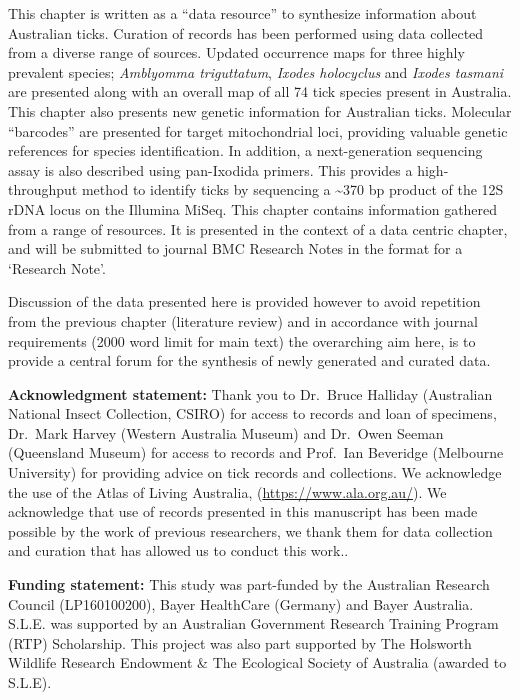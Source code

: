 \documentclass[a4paper, nobind]{templates/ociamthesis}
\begin{document}
This chapter is written as a ``data resource'' to synthesize information about Australian ticks.
Curation of records has been performed using data collected from a diverse range of sources.
Updated occurrence maps for three highly prevalent species; \emph{Amblyomma triguttatum}, \emph{Ixodes holocyclus} and \emph{Ixodes tasmani} are presented along with an overall map of all 74 tick species present in Australia. This chapter also presents new genetic information for Australian ticks.
Molecular ``barcodes'' are presented for target mitochondrial loci, providing valuable genetic references for species identification. In addition, a next-generation sequencing assay is also described using pan-Ixodida primers.
This provides a high-throughput method to identify ticks by sequencing a \textasciitilde370 bp product of the 12S rDNA locus on the Illumina MiSeq.
This chapter contains information gathered from a range of resources.
It is presented in the context of a data centric chapter, and will be submitted to journal BMC Research Notes in the format for a `Research Note'.

Discussion of the data presented here is provided however to avoid repetition from the previous chapter (literature review) and in accordance with journal requirements (2000 word limit for main text) the overarching aim here, is to provide a central forum for the synthesis of newly generated and curated data.

\vspace{5mm}

\textbf{Acknowledgment statement:}
Thank you to Dr.~Bruce Halliday (Australian National Insect Collection, CSIRO) for access to records and loan of specimens, Dr.~Mark Harvey (Western Australia Museum) and Dr.~Owen Seeman (Queensland Museum) for access to records and Prof.~Ian Beveridge (Melbourne University) for providing advice on tick records and collections.
We acknowledge the use of the Atlas of Living Australia, (\url{https://www.ala.org.au/}).
We acknowledge that use of records presented in this manuscript has been made possible by the work of previous researchers, we thank them for data collection and curation that has allowed us to conduct this work..

\vspace{5mm}

\textbf{Funding statement:}
This study was part-funded by the Australian Research Council (LP160100200), Bayer HealthCare (Germany) and Bayer Australia.
S.L.E. was supported by an Australian Government Research Training Program (RTP) Scholarship.
This project was also part supported by The Holsworth Wildlife Research Endowment \& The Ecological Society of Australia (awarded to S.L.E).
\end{document}
